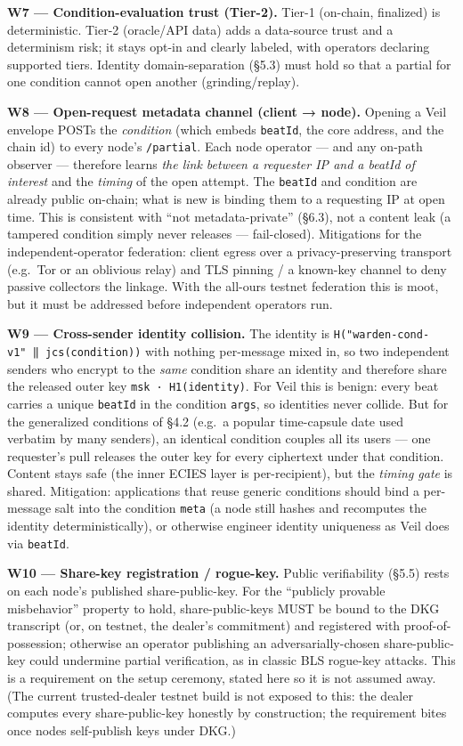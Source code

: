 \documentclass[
  11pt,
]{article}
\begin{document}
\textbf{W7 --- Condition-evaluation trust (Tier-2).} Tier-1 (on-chain,
finalized) is deterministic. Tier-2 (oracle/API data) adds a data-source
trust and a determinism risk; it stays opt-in and clearly labeled, with
operators declaring supported tiers. Identity domain-separation (§5.3)
must hold so that a partial for one condition cannot open another
(grinding/replay).

\textbf{W8 --- Open-request metadata channel (client → node).} Opening a
Veil envelope POSTs the \emph{condition} (which embeds \texttt{beatId},
the core address, and the chain id) to every node's \texttt{/partial}.
Each node operator --- and any on-path observer --- therefore learns
\emph{the link between a requester IP and a beatId of interest} and the
\emph{timing} of the open attempt. The \texttt{beatId} and condition are
already public on-chain; what is new is binding them to a requesting IP
at open time. This is consistent with ``not metadata-private'' (§6.3),
not a content leak (a tampered condition simply never releases ---
fail-closed). Mitigations for the independent-operator federation:
client egress over a privacy-preserving transport (e.g.~Tor or an
oblivious relay) and TLS pinning / a known-key channel to deny passive
collectors the linkage. With the all-ours testnet federation this is
moot, but it must be addressed before independent operators run.

\textbf{W9 --- Cross-sender identity collision.} The identity is
\texttt{H("warden-cond-v1"\ ‖\ jcs(condition))} with nothing per-message
mixed in, so two independent senders who encrypt to the \emph{same}
condition share an identity and therefore share the released outer key
\texttt{msk\ ·\ H1(identity)}. For Veil this is benign: every beat
carries a unique \texttt{beatId} in the condition \texttt{args}, so
identities never collide. But for the generalized conditions of §4.2
(e.g.~a popular time-capsule date used verbatim by many senders), an
identical condition couples all its users --- one requester's pull
releases the outer key for every ciphertext under that condition.
Content stays safe (the inner ECIES layer is per-recipient), but the
\emph{timing gate} is shared. Mitigation: applications that reuse
generic conditions should bind a per-message salt into the condition
\texttt{meta} (a node still hashes and recomputes the identity
deterministically), or otherwise engineer identity uniqueness as Veil
does via \texttt{beatId}.

\textbf{W10 --- Share-key registration / rogue-key.} Public
verifiability (§5.5) rests on each node's published share-public-key.
For the ``publicly provable misbehavior'' property to hold,
share-public-keys MUST be bound to the DKG transcript (or, on testnet,
the dealer's commitment) and registered with proof-of-possession;
otherwise an operator publishing an adversarially-chosen
share-public-key could undermine partial verification, as in classic BLS
rogue-key attacks. This is a requirement on the setup ceremony, stated
here so it is not assumed away. (The current trusted-dealer testnet
build is not exposed to this: the dealer computes every share-public-key
honestly by construction; the requirement bites once nodes self-publish
keys under DKG.)
\end{document}
